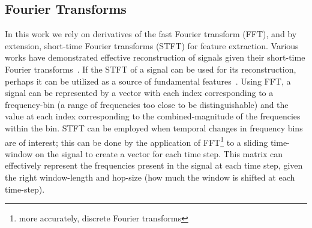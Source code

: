 \documentclass[\main/thesis.tex]{subfiles}
\begin{document}
\subsection{Fourier Transforms}
\label{sec:fourier_transforms}
In this work we rely on derivatives of the fast Fourier transform (FFT), and by extension, short-time Fourier transforms (STFT) for feature extraction. Various works have demonstrated effective reconstruction of signals given their short-time Fourier transforms~\cite{nawab1983signal,griffin1984signal}. If the STFT of a signal can be used for its reconstruction, perhaps it can be utilized as a source of fundamental features~\cite{lee2009unsupervised,huzaifah2017comparison}. Using FFT, a signal can be represented by a vector with each index corresponding to a frequency-bin (a range of frequencies too close to be distinguishable) and the value at each index corresponding to the combined-magnitude of the frequencies within the bin. STFT can be employed when temporal changes in frequency bins are of interest; this can be done by the application of FFT\footnote{more accurately, discrete Fourier transforms} to a sliding time-window on the signal to create a vector for each time step. This matrix can effectively represent the frequencies present in the signal at each time step, given the right window-length and hop-size (how much the window is shifted at each time-step). 
\end{document}
